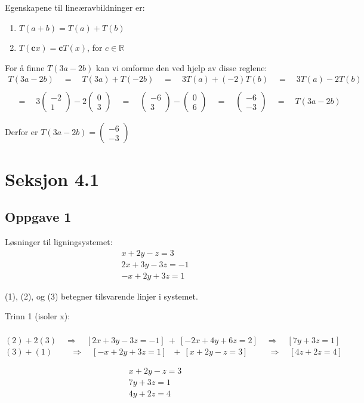 \documentclass{article}
\newcommand{\vect}[1]{\begin{pmatrix} #1 \end{pmatrix}}
\newcommand{\uu}[1]{\underline{\underline{#1}}}
\newcommand{\lra}{\quad\Longrightarrow\quad}
\newcommand{\eqq}{\quad=\quad}
\newcommand{\trip}{\ \ \ }
\begin{document}
Egenskapene til lineæravbildninger er:
\begin{enumerate}
    \item \(T(a+b) = T(a) + T(b)\)
    \item \(T(\textbf{c}x) = \textbf{c}T(x)\), for $c \in \mathbb{R}$
\end{enumerate}

For å finne $T(3a-2b)$ kan vi omforme den ved hjelp av disse reglene: \\
\begin{align*}
    T(3a-2b) \eqq T(3a) + T(-2b) \eqq 3T(a) + (-2)T(b) \eqq 3T(a) -2T(b) \\\\ \eqq 3\vect{-2\\1} - 2\vect{0\\3} \eqq \vect{-6\\3} - \vect{0\\6} \eqq \vect{-6\\-3} \eqq T(3a-2b) 
\end{align*}

Derfor er \uu{$T(3a-2b) = \vect{-6\\-3}$}

\newpage
\section*{Seksjon 4.1}

\subsection*{Oppgave 1}
Løsninger til ligningsystemet:
\begin{align}
    x + 2y - z = 3 \\
    2x + 3y - 3z = -1 \\
    -x + 2y + 3z = 1 
\end{align}

(1), (2), og (3) betegner tilsvarende linjer i systemet.

Trinn 1 (isoler x): \\ \\
$(2) + 2(3) \lra [2x+3y-3z=-1]\ +\ [-2x+4y+6z=2] \lra [7y+3z=1]$ \\ 
$(3) + (1) \quad\, \lra [-x+2y+3z=1]\trip + \ [x+2y-z=3] \quad\ \ \lra [4z+2z=4]$




\setcounter{equation}{0}
\begin{align}
    x + 2y - z = 3 \\
    7y + 3z = 1 \\
    4y + 2z = 4
\end{align}
\end{document}
